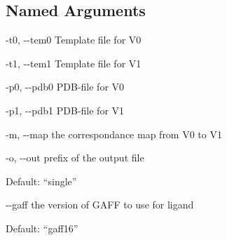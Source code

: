 \documentclass[letterpaper,10pt,english]{sphinxmanual}
\begin{document}
\subsection{Named Arguments}
\label{\detokenize{tools:Named Arguments}}\begin{optionlist}{3cm}
\item [-t0, -{-}tem0]  
Template file for V0
\item [-t1, -{-}tem1]  
Template file for V1
\item [-p0, -{-}pdb0]  
PDB-file for V0
\item [-p1, -{-}pdb1]  
PDB-file for V1
\item [-m, -{-}map]  
the correspondance map from V0 to V1
\item [-o, -{-}out]  
prefix of the output file

Default: “single”
\item [-{-}gaff]  
the version of GAFF to use for ligand

Default: “gaff16”
\end{optionlist}


%
\begin{sphinxVerbatim}[commandchars=\\\{\}]
        
          
          
\end{sphinxVerbatim}

\end{document}
